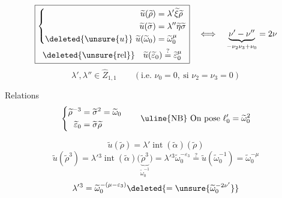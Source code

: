 
\[
\boxed{\begin{gathered}
\left\{\begin{aligned}
\widetilde u(\widetilde\rho)&=\lambda'\widetilde\xi\widetilde\rho\\
\widetilde u(\widetilde\sigma)&=\lambda''\widetilde\eta\widetilde\sigma\\
\deleted{\unsure{u}}\ \widetilde u(\widetilde\omega_0)&=\widetilde\omega_0^\mu
\end{aligned}\right.\\
\deleted{\unsure{\mathrm{rel}}}\quad
\widetilde u(\widetilde\varepsilon_0)\overset?=\widetilde\varepsilon_0^\mu
\end{gathered}}
\quad\Longleftrightarrow\quad
\underbrace{\nu'-\nu''}_{-\nu_2\nu_3+\nu_0}=2\nu
\]
\[
\lambda',\lambda''\in\widehat Z_{1,1}
\qquad(\text{i.e. }\nu_0=0,\ \text{si }\nu_2=\nu_3=0)
\]

Relations
\[
\left\{\begin{aligned}
\widetilde\rho^{-3}&=\widetilde\sigma^2=\widetilde\omega_0\\
\widetilde\varepsilon_0&=\widetilde\sigma\widetilde\rho
\end{aligned}\right.
\qquad \text{\uline{NB} On pose }\ell'_0=\widetilde\omega_0^2
\]


\[
\widetilde u(\widetilde\rho)=\lambda'\operatorname{int}(\widetilde\alpha)(\widetilde\rho)
\]
\[
\widetilde u(\widetilde\rho^3)
=\lambda'{}^3\operatorname{int}(\widetilde\alpha)
 \bigl(\underbrace{\widetilde\rho^3}_{\widetilde\omega_0^{-1}}\bigr)
=\lambda'{}^3\widetilde\omega_0^{-\varepsilon_3}
\overset?=\widetilde u(\widetilde\omega_0^{-1})
=\widetilde\omega_0^{-\mu}
\]
\[
\lambda'{}^3=\widetilde\omega_0^{-(\mu-\varepsilon_3)}
\deleted{=\unsure{\widetilde\omega_0^{-2\nu'}}}
\]
\margin{\[
\boxed{\begin{aligned}
\lambda'&=\widetilde\omega_0^{-\frac{\mu-\varepsilon_3}{3}}\\
\lambda''&=\widetilde\omega_0^{\frac{\mu-\varepsilon_2}{2}}
\end{aligned}}
\begin{aligned}
&=\unsure{\widetilde\omega_0^{-2\nu''}}=\unsure{\ell'_0}^{-\nu''}\\
&=\omega_0^{2\nu'}=\ell'_0{}^{\nu'}
\end{aligned}
\]
\[
\lambda'\lambda''\deleted{\unsure{\nu_3}}=
\omega_0^{\frac{\mu-3\varepsilon_2+2\varepsilon_3}{6}}
\]}

